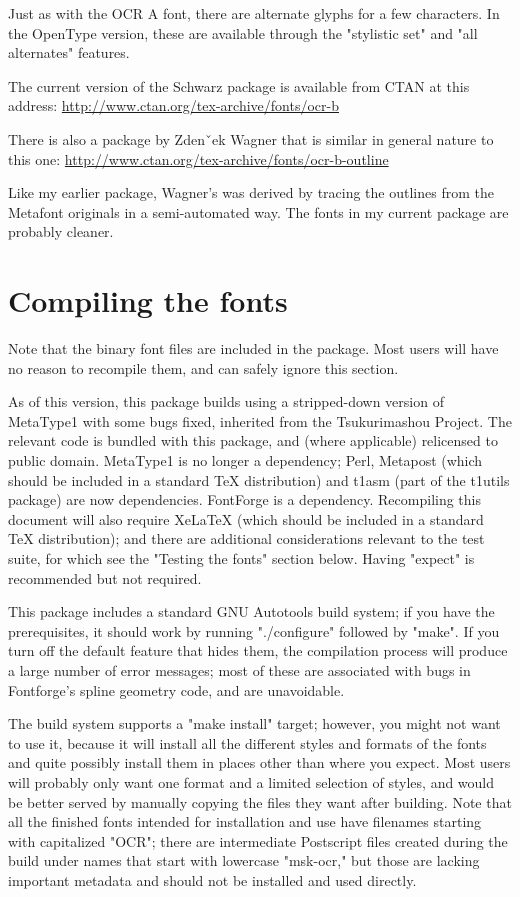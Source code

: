 \documentclass{article}
\begin{document}
Just as with the OCR A font, there are alternate glyphs for a
few characters.  In the OpenType version, these are available through the
"stylistic set" and "all alternates" features.

The current version of the Schwarz package is available from CTAN at this
address:  \url{http://www.ctan.org/tex-archive/fonts/ocr-b}

There is also a package by Zdenˇ\hspace{-0.1in}ek Wagner that is similar
in general nature to this one:
\url{http://www.ctan.org/tex-archive/fonts/ocr-b-outline}

Like my earlier package, Wagner's was derived by tracing the outlines from
the Metafont originals in a semi-automated way.  The fonts in my current
package are probably cleaner.

\section{Compiling the fonts}

Note that the binary font files are included in the package.  Most users
will have no reason to recompile them, and can safely ignore this section.

As of this version, this package builds using a stripped-down version of
MetaType1 with some bugs fixed, inherited from the Tsukurimashou Project. 
The relevant code is bundled with this package, and (where applicable)
relicensed to public domain.  MetaType1 is no longer a dependency; Perl,
Metapost (which should be included in a standard TeX distribution) and t1asm
(part of the t1utils package) are now dependencies.  FontForge is a
dependency.  Recompiling this document will also require XeLaTeX (which
should be included in a standard TeX distribution); and there are additional
considerations relevant to the test suite, for which see the "Testing the
fonts" section below.  Having "expect" is recommended but not required.

This package includes a standard GNU Autotools build system; if you have the
prerequisites, it should work by running "./configure" followed by "make". 
If you turn off the default feature that hides them, the compilation process
will produce a large number of error messages; most of these are associated
with bugs in Fontforge's spline geometry code, and are unavoidable.

The build system supports a "make install" target; however, you might not
want to use it, because it will install all the different styles and
formats of the fonts and quite possibly install them in places other than
where you expect.  Most users will probably only want one format and a
limited selection of styles, and would be better served by manually copying
the files they want after building.  Note that all the finished fonts
intended for installation and use have filenames starting with capitalized
"OCR"; there are intermediate Postscript files created during the build
under names that start with lowercase "msk-ocr," but those are lacking
important metadata and should not be installed and used directly.
\end{document}
